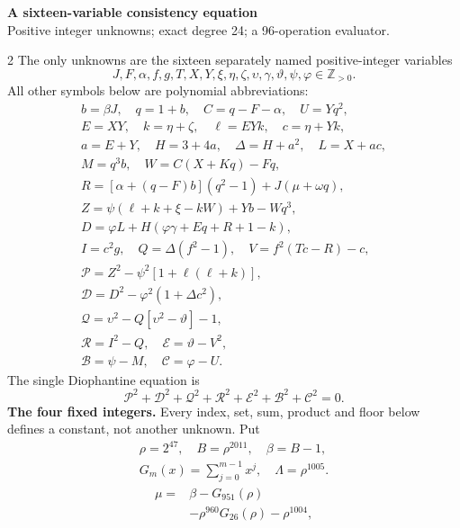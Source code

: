 \documentclass[10pt]{article}
\begin{document}
\begin{center}
{\large\bfseries A sixteen-variable consistency equation}\\[-1pt]
{\small Positive integer unknowns; exact degree 24; a 96-operation evaluator.}
\end{center}\vspace{-8pt}
\begin{multicols}{2}
\fontsize{8.6}{9.1}\selectfont
The only unknowns are the sixteen separately named positive-integer variables
\[
J,F,\alpha,f,g,T,X,Y,\xi,\eta,\zeta,\upsilon,\gamma,\vartheta,\psi,\varphi\in\mathbb Z_{>0}.
\]
All other symbols below are polynomial abbreviations:
\[
\begin{gathered}
b=\beta J,\quad q=1+b,\quad C=q-F-\alpha,\quad U=Yq^2,\\
E=XY,\quad k=\eta+\zeta,\quad \ell=EYk,\quad c=\eta+Yk,\\
a=E+Y,\quad H=3+4a,\quad\Delta=H+a^2,\quad L=X+ac,\\
M=q^3b,\quad W=C(X+Kq)-Fq,\\
R=[\alpha+(q-F)b](q^2-1)+J(\mu+\omega q),\\
Z=\psi(\ell+k+\xi-kW)+Yb-Wq^3,\\
D=\varphi L+H(\varphi\gamma+Eq+R+1-k),\\
I=c^2g,\quad Q=\Delta(f^2-1),\quad V=f^2(Tc-R)-c,\\
\mathcal{P}=Z^2-\psi^2[1+\ell(\ell+k)],\\
\mathcal{D}=D^2-\varphi^2(1+\Delta c^2),\\
\mathcal{Q}=\upsilon^2-Q[\upsilon^2-\vartheta]-1,\\
\mathcal{R}=I^2-Q,\quad \mathcal{E}=\vartheta-V^2,\\
\mathcal{B}=\psi-M,\quad \mathcal{C}=\varphi-U.
\end{gathered}
\]
The single Diophantine equation is
\[
\boxed{\mathcal{P}^2+\mathcal{D}^2+\mathcal{Q}^2+\mathcal{R}^2+\mathcal{E}^2+\mathcal{B}^2+\mathcal{C}^2=0.}
\]
\textbf{The four fixed integers.}
Every index, set, sum, product and floor below defines a constant, not
another unknown. Put
\[
\begin{gathered}
\rho=2^{47},\quad B=\rho^{2011},\quad\beta=B-1,\\
G_m(x)=\sum_{j=0}^{m-1}x^j,\quad
\Lambda=\rho^{1005}.
\end{gathered}
\]
\begin{align*}
\mu={}&\beta-G_{951}(\rho)\\
&-\rho^{960}G_{26}(\rho)-\rho^{1004},\\

\end{align*}
\end{multicols}
\end{document}
